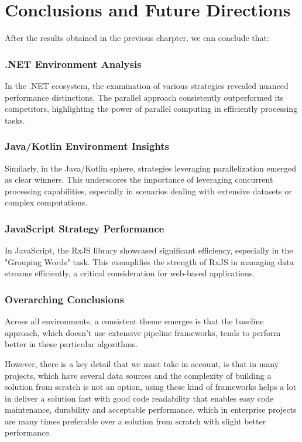 \chapter{Conclusions and Future Directions}

After the results obtained in the previous charpter, we can conclude that:

\subsection{.NET Environment Analysis}
In the .NET ecosystem, the examination of various strategies revealed nuanced performance distinctions. The parallel approach consistently outperformed its competitors, highlighting the power of parallel computing in efficiently processing tasks.

\subsection{Java/Kotlin Environment Insights}
Similarly, in the Java/Kotlin sphere, strategies leveraging parallelization emerged as clear winners. This underscores the importance of leveraging concurrent processing capabilities, especially in scenarios dealing with extensive datasets or complex computations.

\subsection{JavaScript Strategy Performance}
In JavaScript, the RxJS library showcased significant efficiency, especially in the "Grouping Words" task. This exemplifies the strength of RxJS in managing data streams efficiently, a critical consideration for web-based applications.

\subsection{Overarching Conclusions}
Across all environments, a consistent theme emerges is that the baseline approach, which doesn't use extensive pipeline frameworks, tends to perform better in these particular algorithms. 

However, there is a key detail that we must take in account, is that in many projects, which have several data sources and the complexity of building a solution from scratch is not an option, using these kind of frameworks helps a lot in deliver a solution fast with good code readability that enables easy code maintenance, durability and acceptable performance, which in enterprise projects are many times preferable over a solution from scratch with slight better performance.


